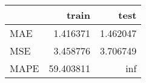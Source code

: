 \begin{tabular}{lrr}
\toprule
{} &      train &      test \\
\midrule
MAE  &   1.416371 &  1.462047 \\
MSE  &   3.458776 &  3.706749 \\
MAPE &  59.403811 &       inf \\
\bottomrule
\end{tabular}
